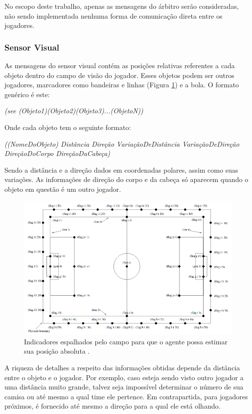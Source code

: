 No escopo deste trabalho, apenas as mensagens do árbitro serão consideradas, não sendo implementada nenhuma forma de comunicação direta entre os jogadores.

\subsubsection{Sensor Visual}

As mensagens do sensor visual contém as posições relativas referentes a cada objeto dentro do campo de visão do jogador. Esses objetos podem ser outros jogadores, marcadores como bandeiras e linhas (Figura \ref{fig:flags}) e a bola. O formato genérico é este:

\textit{(see (Objeto1)(Objeto2)(Objeto3)...(ObjetoN))}

Onde cada objeto tem o seguinte formato:

\textit{((NomeDoObjeto) Distância Direção VariaçãoDeDistância VariaçãoDeDireção DireçãoDoCorpo DireçãoDaCabeça)}

Sendo a distância e a direção dados em coordenadas polares, assim como suas variações. As informações de direção do corpo e da cabeça só aparecem quando o objeto em questão é um outro jogador.

\begin{figure}[H]
	\includegraphics[width=0.9\linewidth]{figs/flags.png}
	\centering
	\caption{Indicadores espalhados pelo campo para que o agente possa estimar sua posição absoluta \cite{rcssmanual2003}.}
	\label{fig:flags}
\end{figure}

A riqueza de detalhes a respeito das informações obtidas depende da distância entre o objeto e o jogador. Por exemplo, caso esteja sendo visto outro jogador a uma distância muito grande, talvez seja impossível determinar o número de sua camisa ou até mesmo a qual time ele pertence. Em contrapartida, para jogadores próximos, é fornecido até mesmo a direção para a qual ele está olhando.

